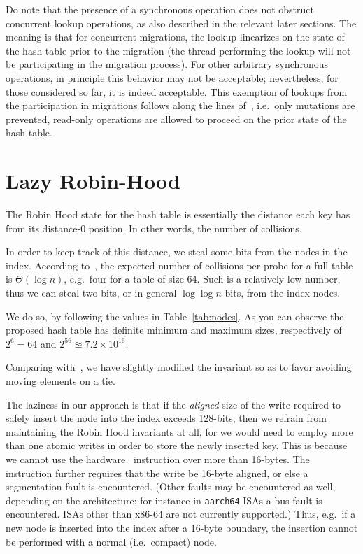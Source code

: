 Do note that the presence of a synchronous operation does not obstruct concurrent lookup operations, as also described in the relevant later sections.
The meaning is that for concurrent migrations, the lookup linearizes on the state of the hash table prior to the migration (the thread performing the lookup will not be participating in the migration process).
For other arbitrary synchronous operations, in principle this behavior may not be acceptable; nevertheless, for those considered so far, it is indeed acceptable.
This exemption of lookups from the participation in migrations follows along the lines of~\cite[\S5.3.2, Preventing Concurrent Updates to Ensure Consistency]{maier}, i.e.\ only mutations are prevented, read-only operations are allowed to proceed on the prior state of the hash table.


\section{Lazy Robin-Hood}\label{sec:lazy-robin-hood}

The Robin Hood state for the hash table is essentially the distance each key has from its distance-0 position.
In other words, the number of collisions.

In order to keep track of this distance, we steal some bits from the nodes in the index.
According to~\cite[Corollary to Theorem~3]{robin-hood}, the expected number of collisions per probe for a full table is $\Theta(\log n)$, e.g.\ four for a table of size 64.
Such is a relatively low number, thus we can steal two bits, or in general $\log \log n$ bits, from the index nodes.

We do so, by following the values in Table~\ref{tab:nodes}.
As you can observe the proposed hash table has definite minimum and maximum sizes, respectively of $2^{6} = 64$ and $2^{56} \approxeq 7.2 \times 10^{16}$.


Comparing with~\cite{robin-hood}, we have slightly modified the invariant so as to favor avoiding moving elements on a tie.

The laziness in our approach is that if the \emph{aligned} size of the write required to safely insert the node into the index exceeds 128-bits, then we refrain from maintaining the Robin Hood invariants at all, for we would need to employ more than one atomic writes in order to store the newly inserted key.
This is because we cannot use the hardware~\cite[CMPXCHG--Compare and Exchange]{x86-64} instruction over more than 16-bytes.
The instruction further requires that the write be 16-byte aligned, or else a segmentation fault is encountered.
(Other faults may be encountered as well, depending on the architecture; for instance in \texttt{aarch64} ISAs a bus fault is encountered.
ISAs other than x86-64 are not currently supported.)
Thus, e.g.\ if a new node is inserted into the index after a 16-byte boundary, the insertion cannot be performed with a normal (i.e.\ compact) node.

